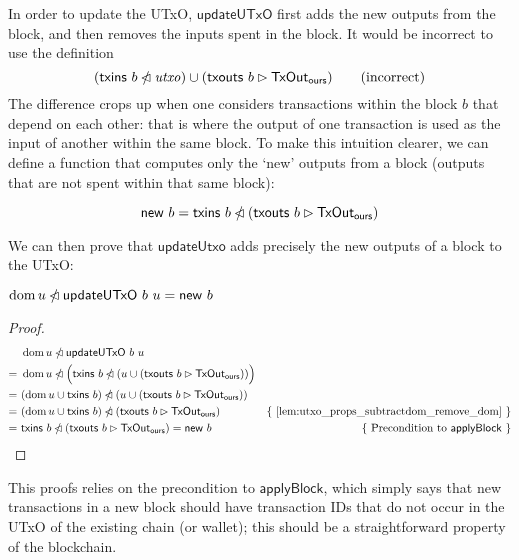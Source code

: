 \documentclass{article}
\newcommand{\restrictdom}{\lhd}
\newcommand{\subtractdom}{\mathbin{\slashed{\restrictdom}}}
\newcommand{\restrictrange}{\rhd}
\DeclareMathOperator{\dom}{dom}
\theoremstyle{definition}{
  \newtheorem{lemma}{Lemma}[section] %
  \newtheorem{definition}[lemma]{Definition}
}
\theoremstyle{theorem}{
  \newtheorem{invariant}[lemma]{Invariant}
  \newtheorem{proofobligation}[lemma]{Proof Obligation}
}
\numberwithin{equation}{lemma}
\begin{document}
In order to update the UTxO, $\mathsf{updateUTxO}$ first adds the new outputs
from the block, and then removes the inputs spent in the block. It would be
incorrect to use the definition
%
\begin{equation*}
(\mathsf{txins} ~ b \subtractdom \mathit{utxo})  \cup (\mathsf{txouts} ~ b \restrictrange \mathsf{TxOut_{ours}})
\tag{incorrect}
\end{equation*}
%
The difference crops up when one considers transactions within the block $b$
that depend on each other: that is where the output of one transaction is used
as the input of another within the same block. To make this intuition clearer,
we can define a function that computes only the `new' outputs from a block
(outputs that are not spent within that same block):
%
\begin{definition}
\begin{equation*}
\mathsf{new} ~ b = \mathsf{txins} ~ b \subtractdom (\mathsf{txouts} ~ b \restrictrange \mathsf{TxOut_{ours}})
\end{equation*}
\end{definition}
%
We can then prove that $\mathsf{updateUtxo}$ adds precisely the new outputs
of a block to the UTxO:
%
\begin{lemma} \label{lem:update_remove_dom}
\begin{math}
\dom u \subtractdom \mathsf{updateUTxO} ~ b ~ u  = \mathsf{new} ~ b
\end{math}
\end{lemma}
%
\begin{proof}
\begin{align*}
  & ~ \dom u \subtractdom \mathsf{updateUTxO} ~ b ~ u \\
= & ~ \dom u \subtractdom \Bigl( \mathsf{txins} ~ b \subtractdom (u \cup (\mathsf{txouts} ~ b \restrictrange \mathsf{TxOut_{ours}})) \Bigr) \\
= & ~ (\dom u \cup \mathsf{txins} ~ b) \subtractdom (u \cup (\mathsf{txouts} ~ b \restrictrange \mathsf{TxOut_{ours}})) \\
= & ~ (\dom u \cup \mathsf{txins} ~ b) \subtractdom (\mathsf{txouts} ~ b \restrictrange \mathsf{TxOut_{ours}}) & \text{\{ \cref{lem:utxo_props_subtractdom_remove_dom} \}} \\
= & ~ \mathsf{txins} ~ b \subtractdom (\mathsf{txouts} ~ b \restrictrange \mathsf{TxOut_{ours}}) = \mathsf{new} ~ b & \text{\{ Precondition to $\mathsf{applyBlock}$ \}}
\end{align*}
\end{proof}
%
This proofs relies on the precondition to $\mathsf{applyBlock}$, which simply
says that new transactions in a new block should have transaction IDs that do
not occur in the UTxO of the existing chain (or wallet); this should be a
straightforward property of the blockchain.
\end{document}
